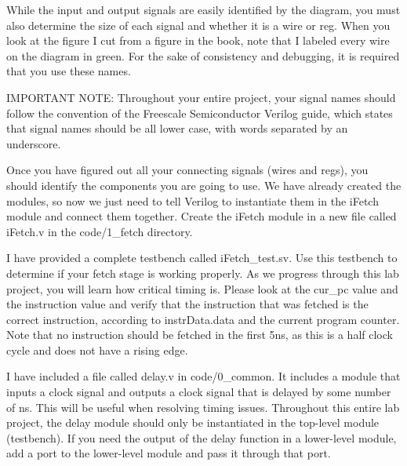 While the input and output signals are easily identified by the diagram, you must also determine the size of each signal and whether it is a wire or reg.  When you look at the figure I cut from a figure in the book, note that I labeled every wire on the diagram in green.  For the sake of consistency and debugging, it is required that you use these names.  

IMPORTANT NOTE: Throughout your entire project, your signal names should follow the convention of the Freescale Semiconductor Verilog guide, which states that signal names should be all lower case, with words separated by an underscore.   

Once you have figured out all your connecting signals (wires and regs), you should identify the components you are going to use.  We have already created the modules, so now we just need to tell Verilog to instantiate them in the iFetch module and connect them together.  Create the iFetch module in a new file called iFetch.v in the code/1\_fetch directory.  

I have provided a complete testbench called iFetch\_test.sv.  Use this testbench to determine if your fetch stage is working properly.  As we progress through this lab project, you will learn how critical timing is.  Please look at the cur\_pc value and the instruction value and verify that the instruction that was fetched is the correct instruction, according to instrData.data and the current program counter.  Note that no instruction should be fetched in the first 5ns, as this is a half clock cycle and does not have a rising edge.  

I have included a file called delay.v in code/0\_common.  It includes a module that inputs a clock signal and outputs a clock signal that is delayed by some number of ns.  This will be useful when resolving timing issues.  Throughout this entire lab project, the delay module should only be instantiated in the top-level module (testbench).  If you need the output of the delay function in a lower-level module, add a port to the lower-level module and pass it through that port.


